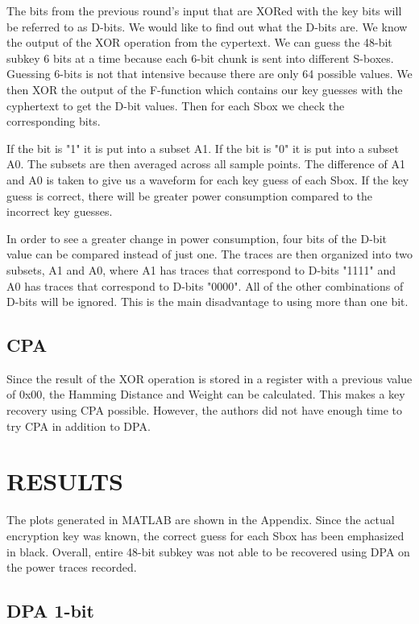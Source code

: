 \documentclass[letterpaper, 10 pt, conference]{ieeeconf}  %
\begin{document}
The bits from the previous round's input that are XORed with the key bits will be referred to as D-bits.  We would like to find out what the D-bits are.  We know the output of the XOR operation from the cypertext.  We can guess the 48-bit subkey 6 bits at a time because each 6-bit chunk is sent into different S-boxes.  Guessing 6-bits is not that intensive because there are only 64 possible values. We then XOR the output of the F-function which contains our key guesses with the cyphertext to get the D-bit values.  Then for each Sbox we check the corresponding bits.

If the bit is "1" it is put into a subset A1.  If the bit is "0" it is put into a subset A0.  The subsets are then averaged across all sample points.  The difference of A1 and A0 is taken to give us a waveform for each key guess of each Sbox.  If the key guess is correct, there will be greater power consumption compared to the incorrect key guesses.

In order to see a greater change in power consumption, four bits of the D-bit value can be compared instead of just one.  The traces are then organized into two subsets, A1 and A0, where A1 has traces that correspond to D-bits "1111" and A0 has traces that correspond to D-bits "0000".  All of the other combinations of D-bits will be ignored.  This is the main disadvantage to using more than one bit.  

\subsection{CPA}

Since the result of the XOR operation is stored in a register with a previous value of 0x00, the Hamming Distance and Weight can be calculated.  This makes a key recovery using CPA possible.  However, the authors did not have enough time to try CPA in addition to DPA.

\section{RESULTS}
 
The plots generated in MATLAB are shown in the Appendix.  Since the actual encryption key was known, the correct guess for each Sbox has been emphasized in black.  Overall, entire 48-bit subkey was not able to be recovered using DPA on the power traces recorded.

\subsection{DPA 1-bit}
\end{document}
